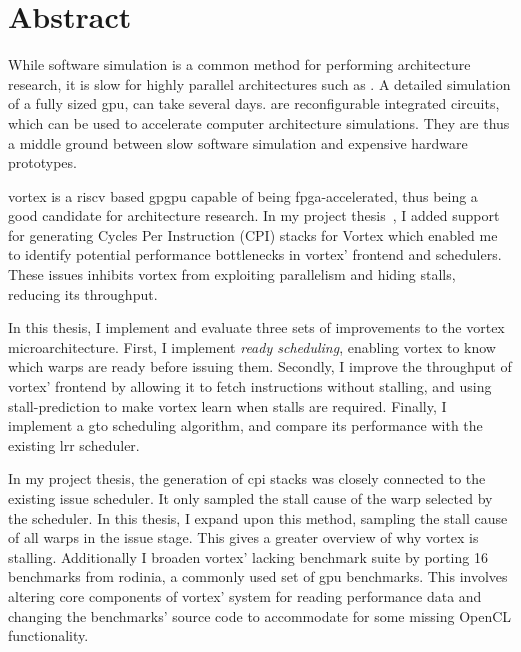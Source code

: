 \chapter*{Abstract}

While software simulation is a common method for performing architecture research, it is slow for highly parallel architectures such as . A detailed simulation of a fully sized \acrshort{gpu}, can take several days.  are reconfigurable integrated circuits, which can be used to accelerate computer architecture simulations. They are thus a middle ground between slow software simulation and expensive hardware prototypes.

\Gls{vortex} is a \Gls{riscv} based \acrshort{gpgpu} capable of being \acrshort{fpga}-accelerated, thus being a good candidate for architecture research. In my project thesis~\cite{Aurud_Project}, I added support for generating Cycles Per Instruction (CPI) stacks for Vortex which enabled me to identify potential performance bottlenecks in \Gls{vortex}' frontend and schedulers. These issues inhibits \Gls{vortex} from exploiting parallelism and hiding stalls, reducing its throughput.

In this thesis, I implement and evaluate three sets of improvements to the \Gls{vortex} microarchitecture. First, I implement \textit{ready scheduling}, enabling \Gls{vortex} to know which warps are ready before issuing them. Secondly, I improve the throughput of \Gls{vortex}' frontend by allowing it to fetch instructions without stalling, and using stall-prediction to make \Gls{vortex} learn when stalls are required. Finally, I implement a \acrfull{gto} scheduling algorithm, and compare its performance with the existing \acrfull{lrr} scheduler.

In my project thesis, the generation of \acrshort{cpi} stacks was closely connected to the existing issue scheduler. It only sampled the stall cause of the warp selected by the scheduler. In this thesis, I expand upon this method, sampling the stall cause of all warps in the issue stage. This gives a greater overview of why \Gls{vortex} is stalling. Additionally I broaden \Gls{vortex}' lacking benchmark suite by porting 16 benchmarks from \Gls{rodinia}, a commonly used set of \acrshort{gpu} benchmarks. This involves altering core components of \Gls{vortex}' system for reading performance data and changing the benchmarks' source code to accommodate for some missing OpenCL functionality. 

